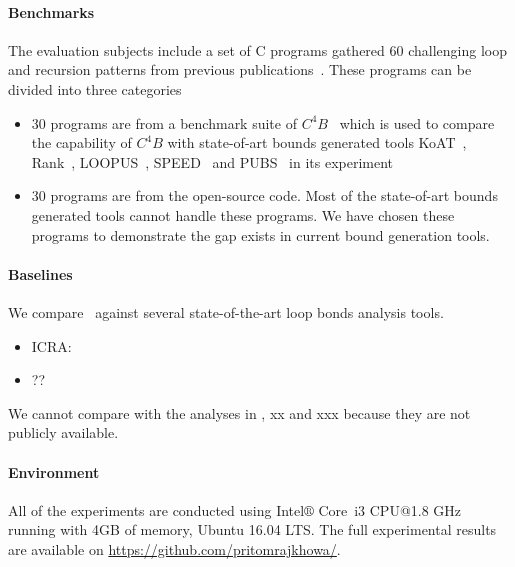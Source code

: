 \paragraph{Benchmarks}
The evaluation subjects include a set of C programs gathered 60 challenging loop and recursion patterns from previous publications~\cite{Gulwani:2010:RP:1806596.1806630,speed1,Carbonneaux:2015:CCR:2737924.2737955}. These programs can be divided into three categories
\begin{itemize}
	\item 30 programs are from a benchmark suite of $C^4B$~\cite{Carbonneaux:2015:CCR:2737924.2737955} which is used to compare the capability of $C^4B$ with state-of-art bounds generated tools KoAT~\cite{Brockschmidt:2016:ARS:2982214.2866575}, Rank~\cite{Alias:2010:MRP:1882094.1882102}, LOOPUS~\cite{10.1007/978-3-319-08867-9_50}, SPEED~\cite{speed1} and PUBS~\cite{Albert:2012:CAO:2076807.2077025} in its experiment
	
	\item 30 programs are from the open-source code. 
	Most of the state-of-art bounds generated tools cannot handle these programs. We have chosen these programs to demonstrate the gap exists in current bound generation tools.	
	
\end{itemize}

\paragraph{Baselines}
We compare \SystemName\ against several state-of-the-art loop bonds analysis tools.
\begin{itemize}
	\item ICRA: 
	\item ??
\end{itemize}
We cannot compare with the analyses in \cite{speed1}, xx and xxx because they are not publicly available.

\paragraph{Environment}
All of the experiments are conducted using Intel$\circledR$ Core\texttrademark\ i3 CPU@1.8 GHz running with 4GB of memory, Ubuntu 16.04 LTS. 
The  full experimental results are available on \url{https://github.com/pritomrajkhowa/}.



